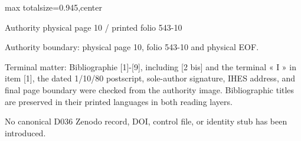 \documentclass[10pt,a4paper]{article}
\begin{document}
\newpage
\noindent\begin{adjustbox}{max totalsize={\textwidth}{0.945\textheight},center}
\begin{minipage}{\textwidth}
\noindent\hfill\scriptsize Authority physical page 10 / printed folio 543-10\par\normalsize
\noindent Authority boundary: physical page 10, folio 543-10 and physical EOF.\par\smallskip
\noindent Terminal matter: Bibliographie [1]-[9], including [2 bis] and the terminal « I » in item [1], the dated 1/10/80 postscript, sole-author signature, IHES address, and final page boundary were checked from the authority image. Bibliographic titles are preserved in their printed languages in both reading layers.\par\smallskip
\noindent No canonical D036 Zenodo record, DOI, control file, or identity stub has been introduced.\par\smallskip
\end{minipage}
\end{adjustbox}
\end{document}
